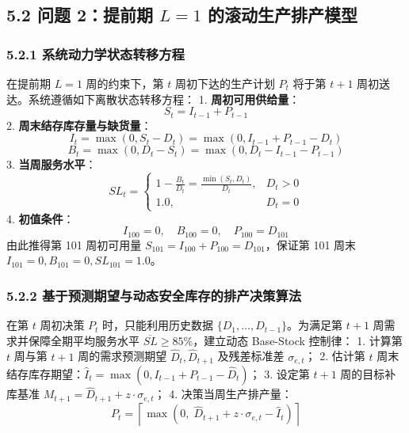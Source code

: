 \subsection{\texorpdfstring{5.2 问题 2：提前期 \(L=1\)
的滚动生产排产模型}{5.2 问题 2：提前期 L=1 的滚动生产排产模型}}\label{ux95eeux9898-2ux63d0ux524dux671f-l1-ux7684ux6edaux52a8ux751fux4ea7ux6392ux4ea7ux6a21ux578b}

\subsubsection{5.2.1
系统动力学状态转移方程}\label{ux7cfbux7edfux52a8ux529bux5b66ux72b6ux6001ux8f6cux79fbux65b9ux7a0b}

在提前期 \(L=1\) 周的约束下，第 \(t\) 周初下达的生产计划 \(P_t\) 将于第
\(t+1\) 周初送达。系统遵循如下离散状态转移方程： 1.
\textbf{周初可用供给量}： \[S_t = I_{t-1} + P_{t-1}\] 2.
\textbf{周末结存库存量与缺货量}：
\[I_t = \max(0, S_t - D_t) = \max(0, I_{t-1} + P_{t-1} - D_t)\]
\[B_t = \max(0, D_t - S_t) = \max(0, D_t - I_{t-1} - P_{t-1})\] 3.
\textbf{当周服务水平}：
\[SL_t = \begin{cases} 1 - \frac{B_t}{D_t} = \frac{\min(S_t, D_t)}{D_t}, & D_t > 0 \\ 1.0, & D_t = 0 \end{cases}\]
4. \textbf{初值条件}：
\[I_{100} = 0, \quad B_{100} = 0, \quad P_{100} = D_{101}\] 由此推得第
101 周初可用量 \(S_{101} = I_{100} + P_{100} = D_{101}\)，保证第 101
周末 \(I_{101} = 0, B_{101} = 0, SL_{101} = 1.0\)。

\subsubsection{5.2.2
基于预测期望与动态安全库存的排产决策算法}\label{ux57faux4e8eux9884ux6d4bux671fux671bux4e0eux52a8ux6001ux5b89ux5168ux5e93ux5b58ux7684ux6392ux4ea7ux51b3ux7b56ux7b97ux6cd5}

在第 \(t\) 周初决策 \(P_t\) 时，只能利用历史数据
\(\{D_1, \dots, D_{t-1}\}\)。为满足第 \(t+1\)
周需求并保障全期平均服务水平 \(\overline{SL} \ge 85\%\)，建立动态
Base-Stock 控制律： 1. 计算第 \(t\) 周与第 \(t+1\) 周的需求预测期望
\(\hat{D}_t, \hat{D}_{t+1}\) 及残差标准差 \(\sigma_{e,t}\)； 2. 估计第
\(t\)
周末结存库存期望：\(\hat{I}_t = \max(0, I_{t-1} + P_{t-1} - \hat{D}_t)\)；
3. 设定第 \(t+1\) 周的目标补库基准
\(M_{t+1} = \hat{D}_{t+1} + z \cdot \sigma_{e,t}\)； 4.
决策当周生产排产量：
\[P_t = \left\lceil \max\left(0, \; \hat{D}_{t+1} + z \cdot \sigma_{e,t} - \hat{I}_t\right) \right\rceil\]

